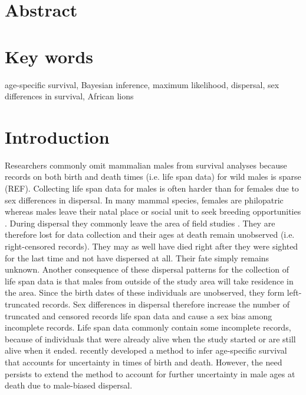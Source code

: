 \section*{Abstract}
%
\section*{Key words}
age-specific survival, Bayesian inference, maximum likelihood, dispersal, sex differences in survival, African lions
%
\section*{Introduction}
Researchers commonly omit mammalian males from survival analyses because records on both birth and death times (i.e. life span data) for wild males is sparse (REF). Collecting life span data for males is often harder than for females due to sex differences in dispersal. In many mammal species, females are philopatric whereas  males leave their natal place or social unit to seek breeding opportunities \citep{ Greenwood:1980bp, Handley:2007tu}. During dispersal they commonly leave the area of field studies \citep[e.g.][]{Pusey:1987vc}. They are therefore lost for data collection and their ages at death remain unobserved (i.e. right-censored records). They may as well have died right after they were sighted for the last time and not have dispersed at all. Their fate simply remains unknown. Another consequence of these dispersal patterns for the collection of life span data is that males from outside of the study area will take residence in the area. Since the birth dates of these individuals are unobserved, they form left-truncated records. Sex differences in dispersal therefore increase the number of truncated and censored records life span data and cause a sex bias among incomplete records. Life span data commonly contain some incomplete records, because of individuals that were already alive when the study started or are still alive when it ended. \citet{Colchero:2012bf} recently developed a method to infer age-specific survival that accounts for uncertainty in times of birth and death. However, the need persists to extend the method to account for further uncertainty in male ages at death due to male-biased dispersal.

